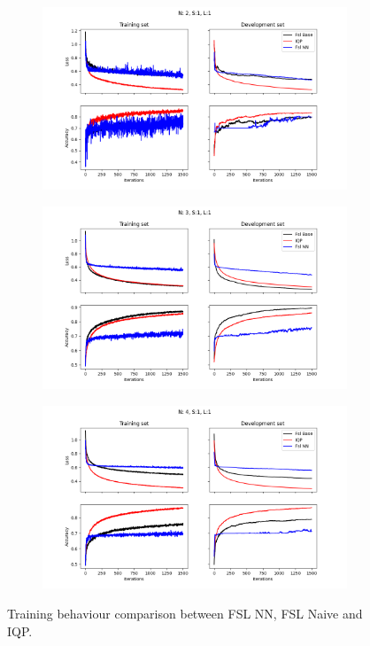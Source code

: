 \begin{figure}
\centering
\begin{subfigure}[b]{.49\textwidth}
    \centering
    \includegraphics[width=\textwidth]{figures/comparison3/Epochs_1500--A_0.05--N_2--S_1--L_1.png}
\end{subfigure}
\begin{subfigure}[b]{.49\textwidth}
    \centering
    \includegraphics[width=\textwidth]{figures/comparison3/Epochs_1500--A_0.05--N_3--S_1--L_1.png}
\end{subfigure}
\begin{subfigure}[b]{.49\textwidth}
    \centering
    \includegraphics[width=\textwidth]{figures/comparison3/Epochs_1500--A_0.05--N_4--S_1--L_1.png}
\end{subfigure}
\caption[Comparison between three \mya for bigger datasets]{\label{fig:2spread} Training behaviour comparison between FSL NN, FSL Naive and IQP.}
\end{figure}